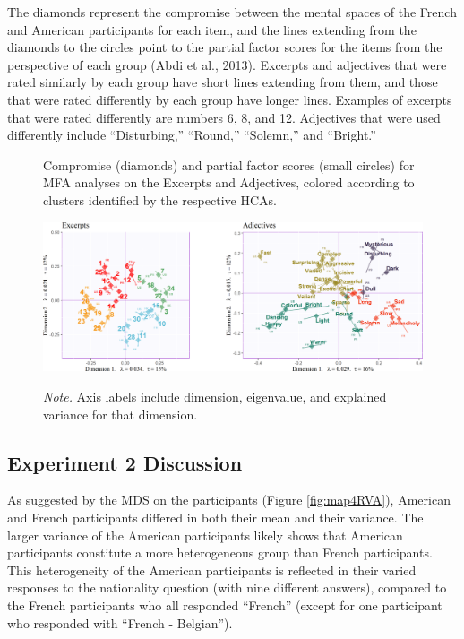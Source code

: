 \documentclass[
  english,
  man,floatsintext]{apa6}
\begin{document}
The diamonds represent the compromise between the mental spaces of the French and American participants for each item, and the lines extending from the diamonds to the circles point to the partial factor scores for the items from the perspective of each group (Abdi et al., 2013). Excerpts and adjectives that were rated similarly by each group have short lines extending from them, and those that were rated differently by each group have longer lines. Examples of excerpts that were rated differently are numbers 6, 8, and 12. Adjectives that were used differently include ``Disturbing,'' ``Round,'' ``Solemn,'' and ``Bright.''

\begin{figure}   
  \centering  
  \caption{Compromise (diamonds) and partial factor scores (small circles) for MFA analyses on the Excerpts and Adjectives, colored according to clusters identified by the respective HCAs.}
    \includegraphics{./Music-Descriptor-Space_files/figure-latex/mfatogether-1.png}
  \label{fig:mfasbs}
  \caption*{\footnotesize \textit{Note.} Axis labels include dimension, eigenvalue, and explained variance for that dimension.}
\end{figure}

\hypertarget{experiment-2-discussion}{%
\subsection{Experiment 2 Discussion}\label{experiment-2-discussion}}

As suggested by the MDS on the participants (Figure \ref{fig:map4RVA}), American and French participants differed in both their mean and their variance. The larger variance of the American participants likely shows that American participants constitute a more heterogeneous group than French participants. This heterogeneity of the American participants is reflected in their varied responses to the nationality question (with nine different answers), compared to the French participants who all responded ``French'' (except for one participant who responded with ``French - Belgian'').
\end{document}
